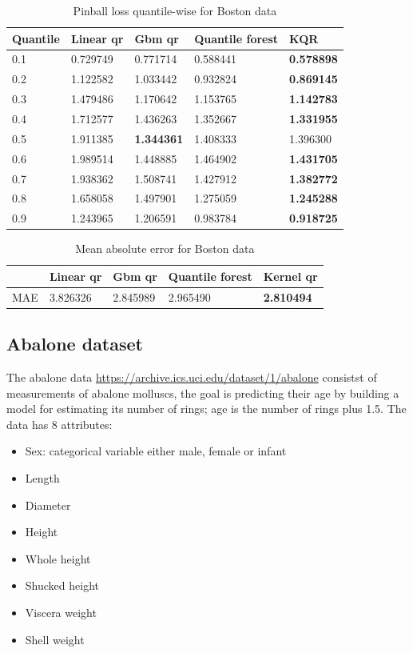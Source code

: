 \begin{table}
    \caption{Pinball loss quantile-wise for Boston data}
\begin{tabular}{lllll}
\toprule
  Quantile  & Linear qr & Gbm qr & Quantile forest & KQR \\
\midrule
0.1 & 0.729749 & 0.771714 & 0.588441 & \textbf{0.578898} \\
0.2 & 1.122582 & 1.033442 & 0.932824 & \textbf{0.869145} \\
0.3 & 1.479486 & 1.170642 & 1.153765 & \textbf{1.142783} \\
0.4 & 1.712577 & 1.436263 & 1.352667 & \textbf{1.331955} \\
0.5 & 1.911385 & \textbf{1.344361} & 1.408333 & 1.396300 \\
0.6 & 1.989514 & 1.448885 & 1.464902 & \textbf{1.431705} \\
0.7 & 1.938362 & 1.508741 & 1.427912 & \textbf{1.382772} \\
0.8 & 1.658058 & 1.497901 & 1.275059 & \textbf{1.245288} \\
0.9 & 1.243965 & 1.206591 & 0.983784 & \textbf{0.918725} \\
\bottomrule
\end{tabular}
\end{table}
        
\begin{table}
\caption{Mean absolute error for Boston data}    
\begin{tabular}{lllll}
\toprule
    & Linear qr & Gbm qr & Quantile forest & Kernel qr \\
\midrule
MAE & 3.826326 & 2.845989 & 2.965490 & \textbf{2.810494} \\
\bottomrule
\end{tabular}

\end{table}

\subsection{Abalone dataset}
The abalone data \href{https://archive.ics.uci.edu/dataset/1/abalone}{https://archive.ics.uci.edu/dataset/1/abalone} consistst of measurements of abalone molluscs, the goal is predicting their age by building a model for estimating its number of rings; age is the number of rings plus 1.5.
The data has 8 attributes:
\begin{itemize}
    \item Sex: categorical variable either male, female or infant
    \item Length
    \item Diameter
    \item Height
    \item Whole height
    \item Shucked height
    \item Viscera weight
    \item Shell weight
\end{itemize}

